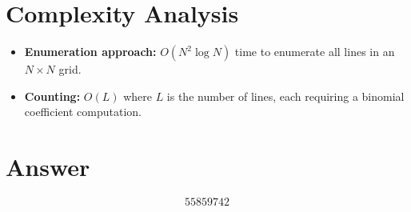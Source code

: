 \documentclass[11pt]{article}
\begin{document}
\section{Complexity Analysis}
\begin{itemize}
    \item \textbf{Enumeration approach:} $O(N^2 \log N)$ time to enumerate all lines in an $N \times N$ grid.
    \item \textbf{Counting:} $O(L)$ where $L$ is the number of lines, each requiring a binomial coefficient computation.
\end{itemize}

\section{Answer}

\[
\boxed{55859742}
\]
\end{document}
